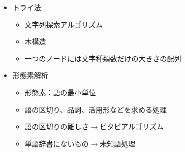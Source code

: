 \documentclass{jsarticle}
\begin{document}
\begin{itemize}
 \item トライ法
       \begin{itemize}
	\item 文字列探索アルゴリズム
	\item 木構造
	\item 一つのノードには文字種類数だけの大きさの配列
       \end{itemize}
 \item 形態素解析
       \begin{itemize}
	\item 形態素：語の最小単位
	\item 語の区切り、品詞、活用形などを求める処理
	\item 語の区切りの難しさ$\rightarrow$ビタビアルゴリズム
	\item 単語辞書にないもの$\rightarrow$未知語処理
	      \begin{itemize}


\end{itemize}
\end{itemize}
\end{itemize}
\end{document}

